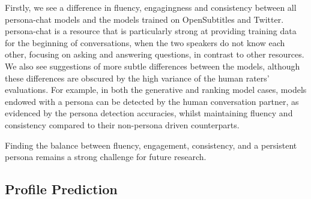  
Firstly, we see a difference in fluency, engagingness and consistency between all {\sc persona-chat}  models and the models trained on OpenSubtitles and Twitter. 
{\sc persona-chat} is a resource that is particularly strong at providing training data for the beginning of conversations, when the two speakers do not know each other, focusing on asking and answering questions, in contrast to other resources.
We also see suggestions of more subtle differences between the models, although these differences are obscured by the high variance of the human raters' evaluations. %
For example, in both the generative and ranking model cases, models endowed with a persona can be detected by the human conversation partner, as evidenced by the persona detection accuracies, whilst maintaining fluency and consistency compared to their non-persona driven counterparts.  


 
Finding the balance between fluency, engagement, consistency, and a persistent persona remains a strong challenge for future research.



\subsection{Profile Prediction}

